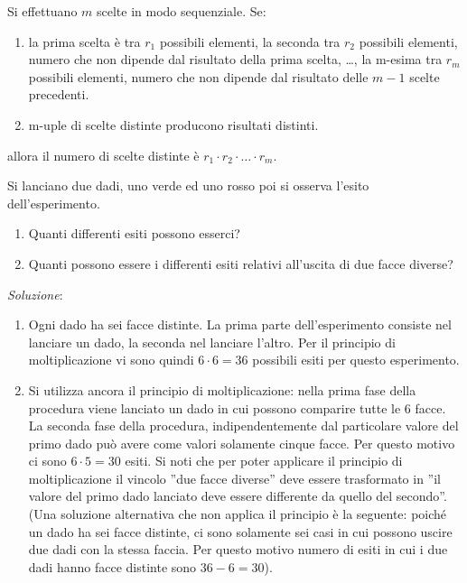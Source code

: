 \begin{defn}
	Si effettuano $m$ scelte in modo sequenziale. Se:
	\begin{enumerate}
		\item la prima scelta è tra $r_1$ possibili elementi, la seconda tra $r_2$
		possibili elementi, numero che non dipende dal risultato della prima scelta,
		\dots, la m-esima tra $r_m$ possibili elementi, numero che non dipende dal
		risultato delle $m-1$ scelte precedenti. 
		
		\item m-uple di scelte distinte producono risultati distinti.
	\end{enumerate}
	allora il numero di scelte distinte è $r_1 \cdot r_2 \cdot \ldots \cdot r_m$.
\end{defn}

\begin{ese}
	Si lanciano due dadi, uno verde ed uno rosso poi si osserva l'esito dell'esperimento.
	\begin{enumerate}
		\item Quanti differenti esiti possono esserci?
		\item Quanti possono essere i differenti esiti relativi all'uscita di due facce diverse?
	\end{enumerate}
	\emph{Soluzione}:
	\begin{enumerate}
		\item Ogni dado ha sei facce distinte. La prima parte dell'esperimento consiste nel lanciare
		un dado, la seconda nel lanciare l'altro. Per il principio di moltiplicazione vi sono quindi
		$6 \cdot6 = 36$ possibili esiti per questo esperimento.
		\item Si utilizza ancora il principio di moltiplicazione: nella prima fase della procedura
		viene lanciato un dado in cui possono comparire tutte le 6 facce. La seconda fase della
		procedura, indipendentemente dal particolare valore del primo dado può avere come valori
		solamente cinque facce.%
		Per questo motivo ci sono $6 \cdot 5 = 30$ esiti. Si noti che per poter applicare il
		principio di moltiplicazione il vincolo ''due facce diverse'' deve essere trasformato
		in ''il valore del primo dado lanciato deve essere differente da quello del secondo''.
		(Una soluzione alternativa che non applica il principio è la seguente: poiché un dado ha sei 
		facce distinte, ci sono solamente sei casi in cui possono uscire
		due dadi con la stessa faccia. Per questo motivo numero di esiti in cui i due dadi hanno facce
		distinte sono $36 - 6 = 30$). \QEDA
	\end{enumerate}
\end{ese}

